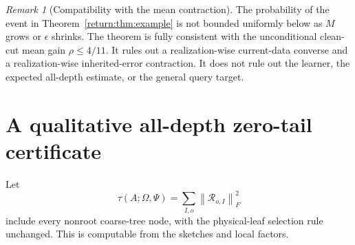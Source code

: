 \documentclass[11pt,oneside,openany,a4paper]{book}
\numberwithin{equation}{chapter}
\theoremstyle{definition}
\theoremstyle{remark}
\newtheorem{remark}[theorem]{Remark}
\newcommand{\F}[1]{\left\lVert#1\right\rVert_F}
\begin{document}
\begin{remark}[Compatibility with the mean contraction]
The probability of the event in Theorem~\ref{return:thm:example} is not bounded uniformly below as $M$ grows or $\epsilon$ shrinks. The theorem is fully consistent with the unconditional clean-cut mean gain $\rho\le4/11$. It rules out a realization-wise current-data converse and a realization-wise inherited-error contraction. It does not rule out the learner, the expected all-depth estimate, or the general query target.
\end{remark}

\section{A qualitative all-depth zero-tail certificate}
Let
\[
 \tau(A;\Omega,\Psi)=\sum_{I,o}\F{\mathcal R_{o,I}}^2
\]
include every nonroot coarse-tree node, with the physical-leaf selection rule unchanged. This is computable from the sketches and local factors.
\end{document}
